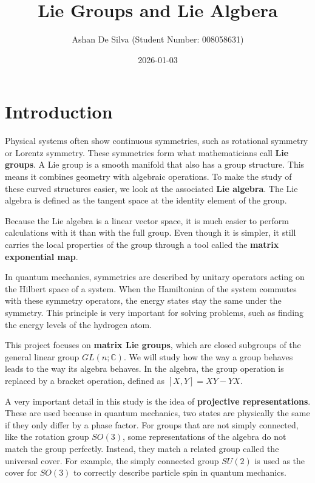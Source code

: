 \documentclass[
]{book}
\title{Lie Groups and Lie Algbera}
\author{Ashan De Silva (Student Number: 008058631)}
\date{2026-01-03}
\theoremstyle{definition}
\theoremstyle{definition}
\theoremstyle{definition}
\theoremstyle{definition}
\theoremstyle{remark}
\begin{document}
\maketitle

{
\setcounter{tocdepth}{1}
\tableofcontents
}
\chapter{Introduction}\label{introduction}

Physical systems often show continuous symmetries, such as rotational symmetry or Lorentz symmetry. These symmetries form what mathematicians call \textbf{Lie groups}. A Lie group is a smooth manifold that also has a group structure. This means it combines geometry with algebraic operations. To make the study of these curved structures easier, we look at the associated \textbf{Lie algebra}. The Lie algebra is defined as the tangent space at the identity element of the group.

Because the Lie algebra is a linear vector space, it is much easier to perform calculations with it than with the full group. Even though it is simpler, it still carries the local properties of the group through a tool called the \textbf{matrix exponential map}.

In quantum mechanics, symmetries are described by unitary operators acting on the Hilbert space of a system. When the Hamiltonian of the system commutes with these symmetry operators, the energy states stay the same under the symmetry. This principle is very important for solving problems, such as finding the energy levels of the hydrogen atom.

This project focuses on \textbf{matrix Lie groups}, which are closed subgroups of the general linear group \(GL(n; \mathbb{C})\). We will study how the way a group behaves leads to the way its algebra behaves. In the algebra, the group operation is replaced by a bracket operation, defined as \([X,Y] = XY - YX\).

A very important detail in this study is the idea of \textbf{projective representations}. These are used because in quantum mechanics, two states are physically the same if they only differ by a phase factor. For groups that are not simply connected, like the rotation group \(SO(3)\), some representations of the algebra do not match the group perfectly. Instead, they match a related group called the universal cover. For example, the simply connected group \(SU(2)\) is used as the cover for \(SO(3)\) to correctly describe particle spin in quantum mechanics.
\end{document}
